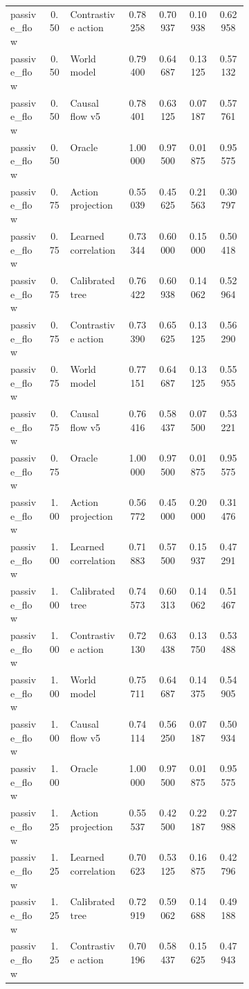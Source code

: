 \documentclass{article}
\begin{document}
\begin{center}
\begin{longtable}{p{0.16\linewidth}cp{0.24\linewidth}cccc}
passive\_flow & 0.50 & Contrastive action & 0.78258 & 0.70937 & 0.10938 & 0.62958\\
passive\_flow & 0.50 & World model & 0.79400 & 0.64687 & 0.13125 & 0.57132\\
passive\_flow & 0.50 & Causal flow v5 & 0.78401 & 0.63125 & 0.07187 & 0.57761\\
passive\_flow & 0.50 & Oracle & 1.00000 & 0.97500 & 0.01875 & 0.95575\\
passive\_flow & 0.75 & Action projection & 0.55039 & 0.45625 & 0.21563 & 0.30797\\
passive\_flow & 0.75 & Learned correlation & 0.73344 & 0.60000 & 0.15000 & 0.50418\\
passive\_flow & 0.75 & Calibrated tree & 0.76422 & 0.60938 & 0.14062 & 0.52964\\
passive\_flow & 0.75 & Contrastive action & 0.73390 & 0.65625 & 0.13125 & 0.56290\\
passive\_flow & 0.75 & World model & 0.77151 & 0.64687 & 0.13125 & 0.55955\\
passive\_flow & 0.75 & Causal flow v5 & 0.76416 & 0.58437 & 0.07500 & 0.53221\\
passive\_flow & 0.75 & Oracle & 1.00000 & 0.97500 & 0.01875 & 0.95575\\
passive\_flow & 1.00 & Action projection & 0.56772 & 0.45000 & 0.20000 & 0.31476\\
passive\_flow & 1.00 & Learned correlation & 0.71883 & 0.57500 & 0.15937 & 0.47291\\
passive\_flow & 1.00 & Calibrated tree & 0.74573 & 0.60313 & 0.14062 & 0.51467\\
passive\_flow & 1.00 & Contrastive action & 0.72130 & 0.63438 & 0.13750 & 0.53488\\
passive\_flow & 1.00 & World model & 0.75711 & 0.64687 & 0.14375 & 0.54905\\
passive\_flow & 1.00 & Causal flow v5 & 0.74114 & 0.56250 & 0.07187 & 0.50934\\
passive\_flow & 1.00 & Oracle & 1.00000 & 0.97500 & 0.01875 & 0.95575\\
passive\_flow & 1.25 & Action projection & 0.55537 & 0.42500 & 0.22187 & 0.27988\\
passive\_flow & 1.25 & Learned correlation & 0.70623 & 0.53125 & 0.16875 & 0.42796\\
passive\_flow & 1.25 & Calibrated tree & 0.72919 & 0.59062 & 0.14688 & 0.49188\\
passive\_flow & 1.25 & Contrastive action & 0.70196 & 0.58437 & 0.15625 & 0.47943\\

\end{longtable}
\end{center}
\end{document}
